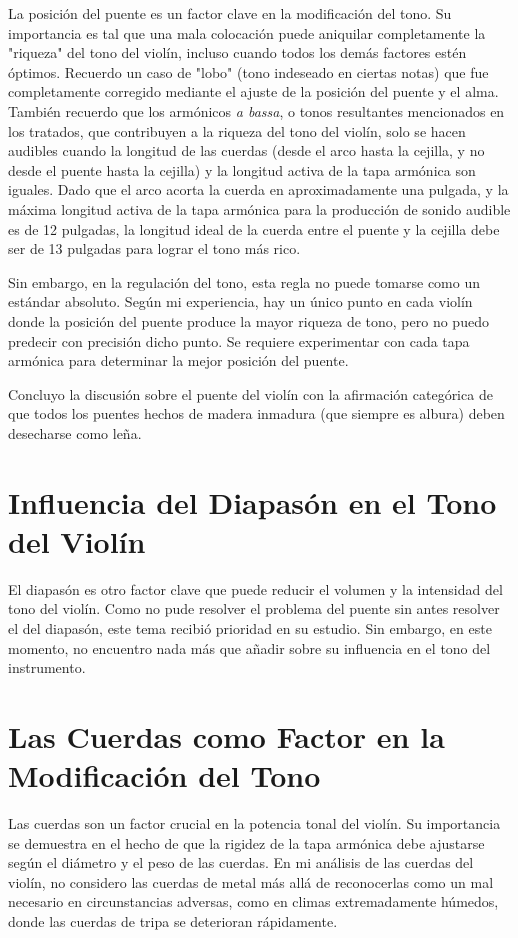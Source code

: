 \documentclass[12pt]{book}
\begin{document}
La posición del puente es un factor clave en la modificación del tono. Su importancia es tal que una mala colocación puede aniquilar completamente la "riqueza" del tono del violín, incluso cuando todos los demás factores estén óptimos. Recuerdo un caso de "lobo" (tono indeseado en ciertas notas) que fue completamente corregido mediante el ajuste de la posición del puente y el alma. También recuerdo que los armónicos \textit{a bassa}, o tonos resultantes mencionados en los tratados, que contribuyen a la riqueza del tono del violín, solo se hacen audibles cuando la longitud de las cuerdas (desde el arco hasta la cejilla, y no desde el puente hasta la cejilla) y la longitud activa de la tapa armónica son iguales. Dado que el arco acorta la cuerda en aproximadamente una pulgada, y la máxima longitud activa de la tapa armónica para la producción de sonido audible es de 12 pulgadas, la longitud ideal de la cuerda entre el puente y la cejilla debe ser de 13 pulgadas para lograr el tono más rico.

Sin embargo, en la regulación del tono, esta regla no puede tomarse como un estándar absoluto. Según mi experiencia, hay un único punto en cada violín donde la posición del puente produce la mayor riqueza de tono, pero no puedo predecir con precisión dicho punto. Se requiere experimentar con cada tapa armónica para determinar la mejor posición del puente.

Concluyo la discusión sobre el puente del violín con la afirmación categórica de que todos los puentes hechos de madera inmadura (que siempre es albura) deben desecharse como leña.

\section*{Influencia del Diapasón en el Tono del Violín}

El diapasón es otro factor clave que puede reducir el volumen y la intensidad del tono del violín. Como no pude resolver el problema del puente sin antes resolver el del diapasón, este tema recibió prioridad en su estudio. Sin embargo, en este momento, no encuentro nada más que añadir sobre su influencia en el tono del instrumento.

\section*{Las Cuerdas como Factor en la Modificación del Tono}

Las cuerdas son un factor crucial en la potencia tonal del violín. Su importancia se demuestra en el hecho de que la rigidez de la tapa armónica debe ajustarse según el diámetro y el peso de las cuerdas. En mi análisis de las cuerdas del violín, no considero las cuerdas de metal más allá de reconocerlas como un mal necesario en circunstancias adversas, como en climas extremadamente húmedos, donde las cuerdas de tripa se deterioran rápidamente.
\end{document}
